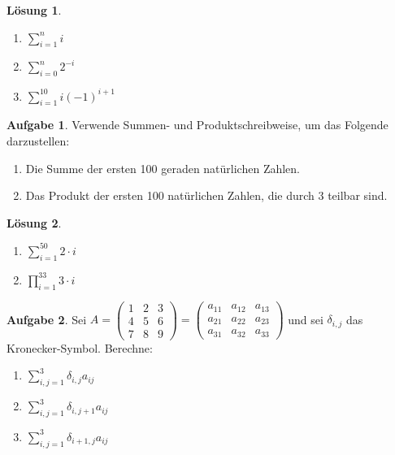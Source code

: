 \documentclass{article}
\theoremstyle{definition}
\newtheorem{ub}{Aufgabe}
\newtheorem*{lo*}{Lösung}
\begin{document}
\begin{tcolorbox}
	\begin{lo*}
		\begin{enumerate}
			\item $ \sum_{i=1}^{n} i $ 
			\item $ \sum_{i=0}^{n} 2^{-i} $
			\item $ \sum_{i=1}^{10} i(-1)^{i+1} $
		\end{enumerate}
	\end{lo*}
\end{tcolorbox}
\begin{ub}
	Verwende Summen- und Produktschreibweise, um das Folgende darzustellen:
	\begin{enumerate}
		\item Die Summe der ersten 100 geraden natürlichen Zahlen.
		\item Das Produkt der ersten 100 natürlichen Zahlen, die durch 3 teilbar sind.
	\end{enumerate}
\end{ub}
	\begin{tcolorbox}
		\begin{lo*}
			\begin{enumerate}
				\item $ \sum_{i=1}^{50} 2 \cdot i $
				\item $ \prod_{i=1}^{33} 3 \cdot i $
			\end{enumerate}
		\end{lo*}
	\end{tcolorbox}
\begin{ub}
	Sei
	$ A = 
	\begin{pmatrix}
		1 & 2 & 3 \\
		4 & 5 & 6 \\
		7 & 8 & 9
	\end{pmatrix} = 
	\begin{pmatrix}
		a_{11} & a_{12} & a_{13} \\
		a_{21} & a_{22} & a_{23} \\
		a_{31} & a_{32} & a_{33}
	\end{pmatrix}
	 $
	 und sei $ \delta_{i,j} $ das Kronecker-Symbol. Berechne:
	 \begin{enumerate}
	 	\item $\sum_{i,j = 1}^{3} \delta_{i,j}a_{ij} $ 
	 	\item $ \sum_{i,j = 1}^{3} \delta_{i,j+1} a_{ij} $
	 	\item $ \sum_{i,j = 1}^{3} \delta_{i+1,j} a_{ij} $
 		\end{enumerate}
\end{ub}
\end{document}
